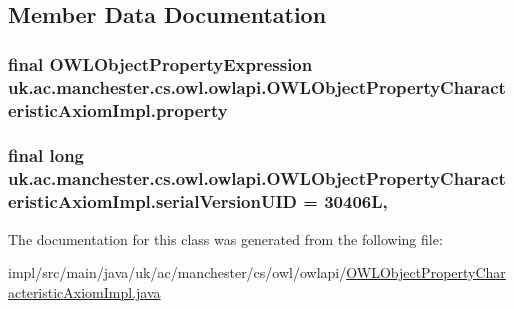 \subsection{Member Data Documentation}
\hypertarget{classuk_1_1ac_1_1manchester_1_1cs_1_1owl_1_1owlapi_1_1_o_w_l_object_property_characteristic_axiom_impl_ac99438140edc10b050c93559f367cdbb}{
\subsubsection[{property}]{\setlength{\rightskip}{0pt plus 5cm}final {\bf O\-W\-L\-Object\-Property\-Expression} uk.\-ac.\-manchester.\-cs.\-owl.\-owlapi.\-O\-W\-L\-Object\-Property\-Characteristic\-Axiom\-Impl.\-property\hspace{0.3cm}{\ttfamily [private]}}}\label{classuk_1_1ac_1_1manchester_1_1cs_1_1owl_1_1owlapi_1_1_o_w_l_object_property_characteristic_axiom_impl_ac99438140edc10b050c93559f367cdbb}
\hypertarget{classuk_1_1ac_1_1manchester_1_1cs_1_1owl_1_1owlapi_1_1_o_w_l_object_property_characteristic_axiom_impl_ae18e5d0026001b65e3d2c33a553df8f6}{
\subsubsection[{serial\-Version\-U\-I\-D}]{\setlength{\rightskip}{0pt plus 5cm}final long uk.\-ac.\-manchester.\-cs.\-owl.\-owlapi.\-O\-W\-L\-Object\-Property\-Characteristic\-Axiom\-Impl.\-serial\-Version\-U\-I\-D = 30406\-L\hspace{0.3cm}{\ttfamily [static]}, {\ttfamily [private]}}}\label{classuk_1_1ac_1_1manchester_1_1cs_1_1owl_1_1owlapi_1_1_o_w_l_object_property_characteristic_axiom_impl_ae18e5d0026001b65e3d2c33a553df8f6}


The documentation for this class was generated from the following file\-:\begin{DoxyCompactItemize}
\item 
impl/src/main/java/uk/ac/manchester/cs/owl/owlapi/\hyperlink{_o_w_l_object_property_characteristic_axiom_impl_8java}{O\-W\-L\-Object\-Property\-Characteristic\-Axiom\-Impl.\-java}\end{DoxyCompactItemize}
